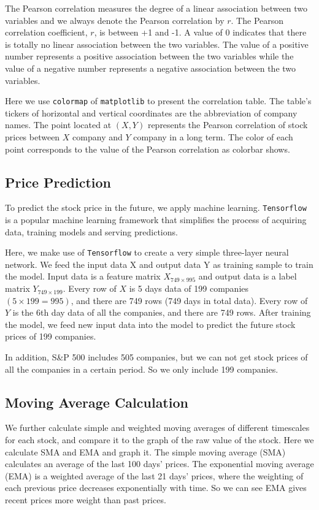 \documentclass{article}
\begin{document}
        The Pearson correlation measures the degree of a linear association between two variables and we always denote the Pearson correlation by $r$. The Pearson correlation coefficient, $r$, is between +1 and -1. A value of 0 indicates that there is totally no linear association between the two variables. The value of a positive number represents a positive association between the two variables while the value of a negative number represents a negative association between the two variables.
        
        Here we use \verb!colormap! of \verb!matplotlib! to present the correlation table. The table's tickers of horizontal and vertical coordinates are the abbreviation of company names. The point located at $(X, Y)$ represents the Pearson correlation of stock prices between $X$ company and $Y$ company in a long term. The color of each point corresponds to the value of the Pearson correlation as colorbar shows. 
    
        \subsection{Price Prediction}
        To predict the stock price in the future, we apply machine learning. \verb!Tensorflow! is a popular machine learning framework that simplifies the process of acquiring data, training models and serving predictions.
        
        Here, we make use of \verb!Tensorflow! to create a very simple three-layer neural network. We feed the input data X and output data Y as training sample to train the model. Input data is a feature matrix $X_{749\times995}$ and output data is a label matrix $Y_{749\times199}$. Every row of $X$ is 5 days data of 199 companies $(5 \times 199 = 995)$, and there are 749 rows (749 days in total data). Every row of $Y$ is the 6th day data of all the companies, and there are 749 rows. After training the model, we feed new input data into the model to predict the future stock prices of 199 companies.             
        
        In addition, S\&P 500 includes 505 companies, but we can not get stock prices of all the companies in a certain period. So we only include 199 companies.
    
        \subsection{Moving Average Calculation}
        We further calculate simple and weighted moving averages of different timescales for each stock, and compare it to the graph of the raw value of the stock. Here we calculate SMA and EMA and graph it. The simple moving average (SMA) calculates an average of the last 100 days' prices. The exponential moving average (EMA) is a weighted average of the last 21 days' prices, where the weighting of each previous price decreases exponentially with time. So we can see EMA gives recent prices more weight than past prices.
        
\end{document}
